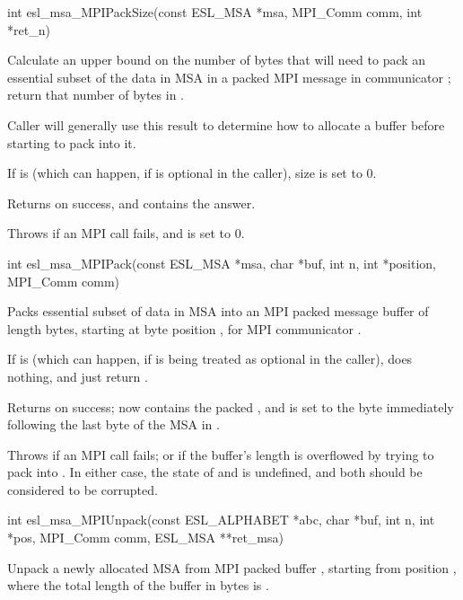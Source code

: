 \begin{sreapi}
\hypertarget{func:esl_msa_MPIPackSize()}
{\item[int esl\_msa\_MPIPackSize(const ESL\_MSA *msa, MPI\_Comm comm, int *ret\_n)]}

Calculate an upper bound on the number of bytes
that  will need to pack an 
essential subset of the data in MSA 
in a packed MPI message in communicator ;
return that number of bytes in . 

Caller will generally use this result to determine how
to allocate a buffer before starting to pack into it.

If  is  (which can happen, if  is
optional in the caller), size  is set to 0.

Returns  on success, and  contains the answer.

Throws  if an MPI call fails, and  is set to 0. 



\hypertarget{func:esl_msa_MPIPack()}
{\item[int esl\_msa\_MPIPack(const ESL\_MSA *msa, char *buf, int n, int *position, MPI\_Comm comm)]}

Packs essential subset of data in MSA  into an MPI
packed message buffer  of length  bytes,
starting at byte position , for MPI
communicator .

If  is  (which can happen, if  is being
treated as optional in the caller), does nothing, and
just return .

Returns  on success;  now contains the
packed , and  is set to the byte
immediately following the last byte of the MSA
in . 

Throws  if an MPI call fails; or  if the
buffer's length  is overflowed by trying to pack
 into . In either case, the state of
 and  is undefined, and both should
be considered to be corrupted.



\hypertarget{func:esl_msa_MPIUnpack()}
{\item[int esl\_msa\_MPIUnpack(const ESL\_ALPHABET *abc, char *buf, int n, int *pos, MPI\_Comm comm, ESL\_MSA **ret\_msa)]}

Unpack a newly allocated MSA from MPI packed buffer
, starting from position , where the total length
of the buffer in bytes is . 


\end{sreapi}
